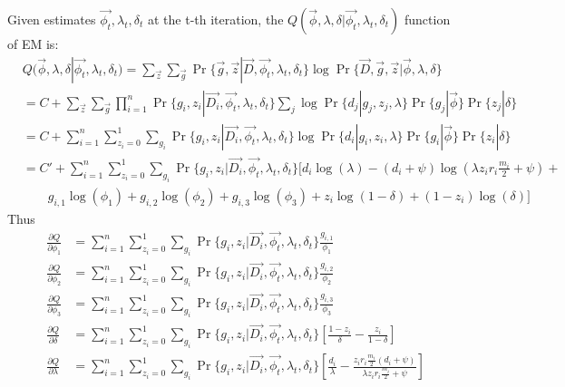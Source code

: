 \documentclass{article}
\begin{document}
Given estimates $\vec{\phi_t}, \lambda_t, \delta_t$ at the t-th iteration, the $Q(\vec{\phi}, \lambda, \delta | \vec{\phi_t}, \lambda_t, \delta_t)$ function of EM is:
\begin{align*}
&Q(\vec{\phi}, \lambda, \delta | \vec{\phi_{t}}, \lambda_{t}, \delta_{t}) = \sum_{\vec{z}}\sum_{\vec{g}} \Pr\{\vec{g}, \vec{z} | \vec{D}, \vec{\phi_{t}}, \lambda_{t}, \delta_{t}\}\log\Pr\{\vec{D}, \vec{g}, \vec{z} | \vec{\phi}, \lambda, \delta\} \\
&= C + \sum_{\vec{z}} \sum_{\vec{g}} \prod_{i=1}^{n} \Pr\{g_i, z_i | \vec{D_i}, \vec{\phi_{t}}, \lambda_{t}, \delta_{t}\}\sum_{j} \log\Pr\{d_j | g_j, z_j, \lambda\}\Pr\{g_j | \vec{\phi}\}\Pr\{z_j | \delta\} \\
&= C + \sum_{i=1}^{n} \sum_{z_i = 0}^{1} \sum_{g_i} \Pr\{g_i, z_i | \vec{D_i}, \vec{\phi_{t}}, \lambda_{t}, \delta_{t}\}\log\Pr\{d_i | g_i, z_i, \lambda\}\Pr\{g_i | \vec{\phi}\}\Pr\{z_i | \delta\} \\
&= C' + \sum_{i=1}^{n} \sum_{z_i = 0}^{1} \sum_{g_i} \Pr\{g_i, z_i | \vec{D_i}, \vec{\phi_{t}}, \lambda_{t}, \delta_{t}\}\bigg[d_i\log(\lambda) - (d_i + \psi)\log(\lambda z_i r_i \frac{m_i}{2} + \psi) + \\
&\qquad g_{i,1}\log(\phi_1) + g_{i,2}\log(\phi_2) + g_{i,3}\log(\phi_3) + z_i\log(1 - \delta) + (1 - z_i)\log(\delta) \bigg]
\end{align*}
Thus
\begin{align*}
\frac{\partial Q}{\partial \phi_1} &= \sum_{i=1}^{n} \sum_{z_i = 0}^{1} \sum_{g_i} \Pr\{g_i, z_i | \vec{D_i}, \vec{\phi_{t}}, \lambda_{t}, \delta_{t}\} \frac{g_{i,1}}{\phi_1} \\
\frac{\partial Q}{\partial \phi_2} &= \sum_{i=1}^{n} \sum_{z_i = 0}^{1} \sum_{g_i} \Pr\{g_i, z_i | \vec{D_i}, \vec{\phi_{t}}, \lambda_{t}, \delta_{t}\} \frac{g_{i,2}}{\phi_2} \\
\frac{\partial Q}{\partial \phi_3} &= \sum_{i=1}^{n} \sum_{z_i = 0}^{1} \sum_{g_i} \Pr\{g_i, z_i | \vec{D_i}, \vec{\phi_{t}}, \lambda_{t}, \delta_{t}\} \frac{g_{i,3}}{\phi_3} \\
\frac{\partial Q}{\partial \delta} &= \sum_{i=1}^{n} \sum_{z_i = 0}^{1} \sum_{g_i} \Pr\{g_i, z_i | \vec{D_i}, \vec{\phi_{t}}, \lambda_{t}, \delta_{t}\} \left[\frac{1 - z_i}{\delta} - \frac{z_i}{1 - \delta}\right] \\
\frac{\partial Q}{\partial \lambda} &= \sum_{i=1}^{n} \sum_{z_i = 0}^{1} \sum_{g_i} \Pr\{g_i, z_i | \vec{D_i}, \vec{\phi_{t}}, \lambda_{t}, \delta_{t}\} \left[\frac{d_i}{\lambda} - \frac{z_i r_i \frac{m_i}{2}(d_i + \psi)}{\lambda z_i r_i \frac{m_i}{2} + \psi} \right] \\
\end{align*}
\end{document}
